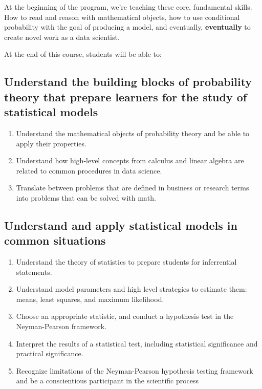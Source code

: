 \documentclass[
]{book}
\providecommand{\tightlist}{%
  \setlength{\itemsep}{0pt}\setlength{\parskip}{0pt}}
\theoremstyle{definition}
\theoremstyle{definition}
\theoremstyle{definition}
\theoremstyle{definition}
\theoremstyle{remark}
\begin{document}
At the beginning of the program, we're teaching these core, fundamental skills. How to read and reason with mathematical objects, how to use conditional probability with the goal of producing a model, and eventually, \textbf{eventually} to create novel work as a data scientist.

At the end of this course, students will be able to:

\hypertarget{understand-the-building-blocks-of-probability-theory-that-prepare-learners-for-the-study-of-statistical-models}{%
\subsection{Understand the building blocks of probability theory that prepare learners for the study of statistical models}\label{understand-the-building-blocks-of-probability-theory-that-prepare-learners-for-the-study-of-statistical-models}}

\begin{enumerate}
\def\labelenumi{\arabic{enumi}.}
\tightlist
\item
  Understand the mathematical objects of probability theory and be able to apply their properties.
\item
  Understand how high-level concepts from calculus and linear algebra are related to common procedures in data science.
\item
  Translate between problems that are defined in business or research terms into problems that can be solved with math.
\end{enumerate}

\hypertarget{understand-and-apply-statistical-models-in-common-situations}{%
\subsection{Understand and apply statistical models in common situations}\label{understand-and-apply-statistical-models-in-common-situations}}

\begin{enumerate}
\def\labelenumi{\arabic{enumi}.}
\tightlist
\item
  Understand the theory of statistics to prepare students for inferrential statements.
\item
  Understand model parameters and high level strategies to estimate them: means, least squares, and maximum likelihood.
\item
  Choose an appropriate statistic, and conduct a hypothesis test in the Neyman-Pearson framework.
\item
  Interpret the results of a statistical test, including statistical significance and practical significance.
\item
  Recognize limitations of the Neyman-Pearson hypothesis testing framework and be a conscientious participant in the scientific process
\end{enumerate}
\end{document}

